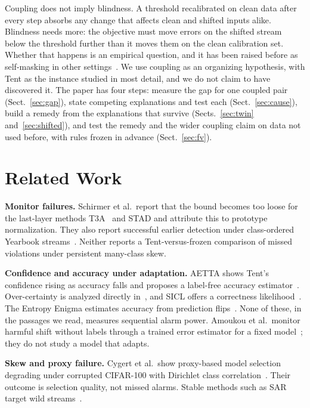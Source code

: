 \documentclass[runningheads]{llncs}
\begin{document}
Coupling does not imply blindness. A threshold recalibrated on clean data after every step absorbs any change that affects clean and shifted inputs alike. Blindness needs more: the objective must move errors on the shifted stream below the threshold further than it moves them on the clean calibration set. Whether that happens is an empirical question, and it has been raised before as self-masking in other settings~\cite{Han2026Exchangeability}. We use coupling as an organizing hypothesis, with Tent as the instance studied in most detail, and we do not claim to have discovered it. The paper has four steps: measure the gap for one coupled pair (Sect.~\ref{sec:gap}), state competing explanations and test each (Sect.~\ref{sec:cause}), build a remedy from the explanations that survive (Sects.~\ref{sec:twin} and~\ref{sec:shifted}), and test the remedy and the wider coupling claim on data not used before, with rules frozen in advance (Sect.~\ref{sec:fv}).

\section{Related Work}
\textbf{Monitor failures.} Schirmer et al.\ report that the bound becomes too loose for the last-layer methods T3A~\cite{Iwasawa2021T3A} and STAD and attribute this to prototype normalization. They also report successful earlier detection under class-ordered Yearbook streams~\cite[A.5]{Schirmer2025Monitoring}. Neither reports a Tent-versus-frozen comparison of missed violations under persistent many-class skew.

\textbf{Confidence and accuracy under adaptation.} AETTA shows Tent's confidence rising as accuracy falls and proposes a label-free accuracy estimator~\cite{Lee2024AETTA}. Over-certainty is analyzed directly in~\cite{Amin2025OverCertainty}, and SICL offers a correctness likelihood~\cite{Nam2026SICL}. The Entropy Enigma estimates accuracy from prediction flips~\cite{Press2024EntropyEnigma}. None of these, in the passages we read, measures sequential alarm power. Amoukou et al.\ monitor harmful shift without labels through a trained error estimator for a fixed model~\cite{Amoukou2024SequentialHarmful}; they do not study a model that adapts.

\textbf{Skew and proxy failure.} Cygert et al.\ show proxy-based model selection degrading under corrupted CIFAR-100 with Dirichlet class correlation~\cite{Cygert2026RealisticSelection}. Their outcome is selection quality, not missed alarms. Stable methods such as SAR target wild streams~\cite{Niu2023SAR}.
\end{document}
